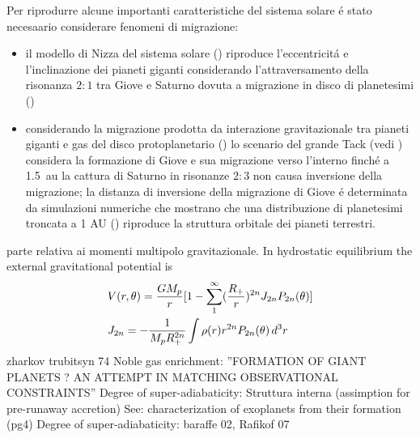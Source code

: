 Per riprodurre alcune importanti caratteristiche del sistema solare \'e stato necesaario considerare fenomeni di migrazione:
\begin{itemize}
\item  il modello di Nizza del sistema solare (\cite{tsiganis2005origin}) riproduce l'eccentricit\'a e l'inclinazione dei pianeti giganti considerando l'attraversamento della risonanza $2:1$ tra Giove e Saturno dovuta a migrazione in disco di planetesimi (\cite{hahn1999orbital})
\item considerando la migrazione prodotta da interazione gravitazionale tra pianeti giganti e gas del disco protoplanetario (\cite{lin1986tidal}) lo scenario del grande Tack (vedi \cite{walsh2011low}) considera la formazione di Giove e sua migrazione verso l'interno finch\'e a \SI{1.5}{\astronomicalunit} la cattura di Saturno in risonanze $2:3$ non causa inversione della migrazione; la distanza di inversione della migrazione di Giove \'e determinata da simulazioni numeriche che mostrano che una distribuzione di planetesimi troncata a 1 AU (\cite{hansen2009formation}) riproduce la struttura orbitale dei pianeti terrestri.
\end{itemize}


\begin{workout}
parte relativa ai momenti multipolo gravitazionale. 
In hydrostatic equilibrium the external gravitational potential is
\begin{align}
&V(r,\theta)=\frac{GM_p}{r}[1-\sum_1^{\infty}(\frac{R_+}{r})^{2n}J_{2n}P_{2n}(\theta)]\\
&J_{2n}=-\frac{1}{M_pR_+^{2n}}\int\rho(r) r^{2n}P_{2n}(\theta)\,d^3r
\end{align}
zharkov trubitsyn 74
Noble gas enrichment: ''FORMATION OF GIANT PLANETS ? AN ATTEMPT IN MATCHING OBSERVATIONAL CONSTRAINTS''
Degree of super-adiabaticity: Struttura interna (assimption for pre-runaway accretion)
See: characterization of exoplanets from their formation (pg4)
Degree of super-adiabaticity: baraffe 02, Rafikof 07
\end{workout}

